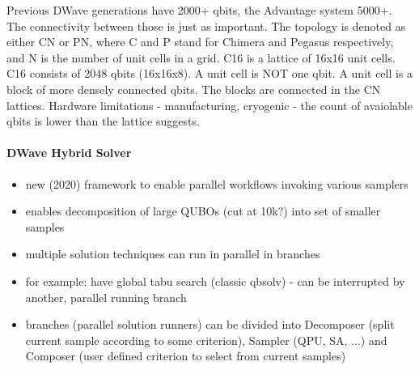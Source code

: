 Previous DWave generations have 2000+ qbits, the Advantage system 5000+. The
connectivity between those is just as important. The topology is denoted as
either CN or PN, where C and P stand for Chimera and Pegasus respectively, and N
is the number of unit cells in a grid. C16 is a lattice of 16x16 unit cells. C16
consists of 2048 qbits (16x16x8). A unit cell is NOT one qbit. A unit cell is a
block of more densely connected qbits. The blocks are connected in the CN
lattices.
Hardware limitations - manufacturing, cryogenic - the count of avaiolable qbits
is lower than the lattice suggests. 


\paragraph{DWave Hybrid Solver}
\begin{itemize}
  \item new (2020) framework to enable parallel workflows invoking various
	samplers
  \item enables decomposition of large QUBOs (cut at 10k?) into set of smaller
	samples
  \item multiple solution techniques can run in parallel in branches
  \item for example: have global tabu search (classic qbsolv) - can be
	interrupted by another, parallel running branch
  \item branches (parallel solution runners) can be divided into Decomposer
	(split current sample according to some criterion),
	Sampler (QPU, SA, ...) and Composer (user defined criterion to select from
  current samples)
\end{itemize}

